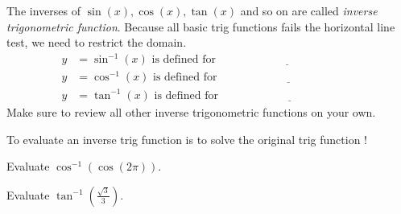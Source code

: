 \documentclass[../main.tex]{subfiles}
\begin{document}
  The inverses of \(\sin(x), \cos(x), \tan(x)\) and so on are called \emph{inverse trigonometric function}. Because all basic trig functions fails the horizontal line test, we need to restrict the domain.
  \medskip
  \begin{align*}
    y &= \sin^{-1}(x) \text{ is defined for } \underline{\hspace{2in}} \\[3ex]
    y &= \cos^{-1}(x) \text{ is defined for } \underline{\hspace{2in}} \\[3ex]
    y &= \tan^{-1}(x) \text{ is defined for } \underline{\hspace{2in}}
  \end{align*}
  Make sure to review all other inverse trigonometric functions on your own.
  \bigskip

  To evaluate an inverse trig function is to solve the original trig function !

  \begin{example}
    Evaluate \(\cos^{-1}(\cos(2\pi))\). 
  \end{example}

  \begin{example}
    Evaluate \(\tan^{-1}\left(\frac{\sqrt{3}}{3}\right)\).
  \end{example}
\end{document}
